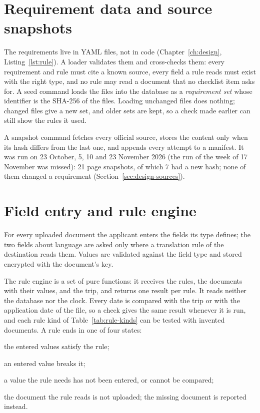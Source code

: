 \section{Requirement data and source snapshots}
The requirements live in YAML files, not in code (Chapter~\ref{ch:design},
Listing~\ref{lst:rule}). A loader validates them and cross-checks them: every requirement and rule
must cite a known source, every field a rule reads must exist with the right type, and no rule may
read a document that no checklist item asks for. A seed command loads the files into the database
as a \emph{requirement set} whose identifier is the SHA-256 of the files. Loading unchanged files
does nothing; changed files give a new set, and older sets are kept, so a check made earlier can
still show the rules it used.

A snapshot command fetches every official source, stores the content only when its hash differs
from the last one, and appends every attempt to a manifest. It was run on 23 October, 5, 10 and
23 November 2026 (the run of the week of 17 November was missed): 21 page snapshots, of which 7
had a new hash; none of them changed a requirement (Section~\ref{sec:design-sources}).

\section{Field entry and rule engine}\label{sec:engine}
For every uploaded document the applicant enters the fields its type defines; the two fields about
language are asked only where a translation rule of the destination reads them. Values are
validated against the field type and stored encrypted with the document's key.

The rule engine is a set of pure functions: it receives the rules, the documents with their
values, and the trip, and returns one result per rule. It reads neither the database nor the
clock. Every date is compared with the trip or with the application date of the file, so a check
gives the same result whenever it is run, and each rule kind of Table~\ref{tab:rule-kinds} can be
tested with invented documents. A rule ends in one of four states:

\begin{description}[style=nextline,leftmargin=2.2cm]
  \item[passed] the entered values satisfy the rule;
  \item[failed] an entered value breaks it;
  \item[incomplete] a value the rule needs has not been entered, or cannot be compared;
  \item[skipped] the document the rule reads is not uploaded; the missing document is reported
    instead.
\end{description}

